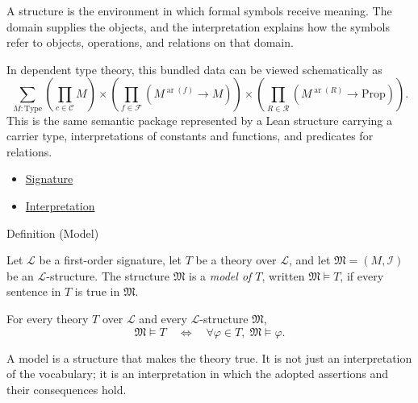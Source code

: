 \begin{remark*}[Interpretation]
A structure is the environment in which formal symbols receive meaning. The
domain supplies the objects, and the interpretation explains how the symbols
refer to objects, operations, and relations on that domain.
\end{remark*}

\begin{remark*}
In dependent type theory, this bundled data can be viewed schematically as
\[
\sum_{M:\mathrm{Type}}
\left(\prod_{c\in\mathcal{C}} M\right)
\times
\left(\prod_{f\in\mathcal{F}}(M^{\operatorname{ar}(f)}\to M)\right)
\times
\left(\prod_{R\in\mathcal{R}}(M^{\operatorname{ar}(R)}\to \mathrm{Prop})\right).
\]
This is the same semantic package represented by a Lean structure carrying a
carrier type, interpretations of constants and functions, and predicates for
relations.
\end{remark*}

\begin{dependencies}
\begin{itemize}
  \item \hyperref[def:signature]{Signature}
  \item \hyperref[def:axiom-systems-interpretation]{Interpretation}
\end{itemize}
\end{dependencies}

\begin{definitionbox}{Definition (Model)}
\begin{definition}[Model]
\label{def:axiom-systems-model}
Let $\mathcal{L}$ be a first-order signature, let $T$ be a theory over
$\mathcal{L}$, and let $\mathfrak{M}=(M,\mathcal{I})$ be an
$\mathcal{L}$-structure. The structure $\mathfrak{M}$ is a \emph{model of
$T$}, written $\mathfrak{M}\vDash T$, if every sentence in $T$ is true in
$\mathfrak{M}$.
\end{definition}
\end{definitionbox}

\begin{remark*}
For every theory $T$ over $\mathcal{L}$ and every $\mathcal{L}$-structure
$\mathfrak{M}$,
\[
  \mathfrak{M}\vDash T
  \quad\Longleftrightarrow\quad
  \forall \varphi\in T,\; \mathfrak{M}\vDash \varphi.
\]
\end{remark*}

\begin{remark*}[Interpretation]
A model is a structure that makes the theory true. It is not just an
interpretation of the vocabulary; it is an interpretation in which the adopted
assertions and their consequences hold.
\end{remark*}

